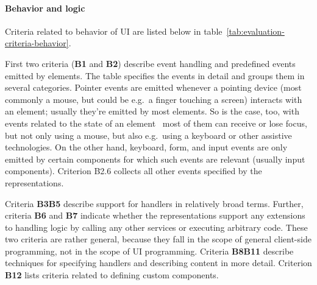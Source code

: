 \paragraph{Behavior and logic}

Criteria related to behavior of UI are listed below in table~\ref{tab:evaluation-criteria-behavior}.

First two criteria (\textbf{B1} and \textbf{B2}) describe event handling and predefined events emitted by elements.
The table specifies the events in detail and groups them in several categories.
Pointer events are emitted whenever a pointing device (most commonly a mouse, but could be e.g.\ a finger touching a screen) interacts with an element; usually they're emitted by most elements.
So is the case, too, with events related to the state of an element \textendash\ most of them can receive or lose focus, but not only using a mouse, but also e.g.\ using a keyboard or other assistive technologies.
On the other hand, keyboard, form, and input events are only emitted by certain components for which such events are relevant (usually input components).
Criterion B2.6 collects all other events specified by the representations.


Criteria \textbf{B3}\textendash\textbf{B5} describe support for handlers in relatively broad terms.
Further, criteria \textbf{B6} and \textbf{B7} indicate whether the representations support any extensions to handling logic by calling any other services or executing arbitrary code.
These two criteria are rather general, because they fall in the scope of general client-side programming, not in the scope of UI programming.
Criteria \textbf{B8}\textendash\textbf{B11} describe techniques for specifying handlers and describing content in more detail.
Criterion \textbf{B12} lists criteria related to defining custom components.

